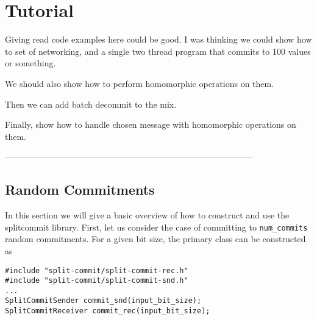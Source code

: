 
\section{Tutorial}

Giving read code examples here could be good. I was thinking we could show how to set of networking, and a single two thread program that commits to 100 values or something.

We should also show how to perform homomorphic operations on them.

Then we can add batch decommit to the mix.

Finally, show how to handle chosen message with homomorphic operations on them.

---------------------------------------------------------------------------------------


\subsection{Random Commitments}
In this section we will give a basic overview of how to construct and use the splitcommit library. First, let us consider the case of committing to \texttt{num\_commits} random commitments. For a given bit size, the primary class can be constructed as
\begin{lstlisting}
#include "split-commit/split-commit-rec.h"
#include "split-commit/split-commit-snd.h"
...
SplitCommitSender commit_snd(input_bit_size);
SplitCommitReceiver commit_rec(input_bit_size);
\end{lstlisting}

